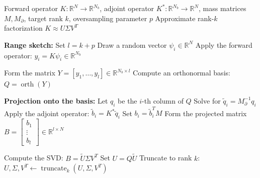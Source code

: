 \begin{algorithm}[!thbp]
\caption{Matrix-free rSVD approximation of $K$}
\label{alg:discrete_rsvd}
\begin{algorithmic}[1]
    \Require Forward operator $K: \mathbb{R}^N \to \mathbb{R}^{N_b}$, adjoint operator $K^*: \mathbb{R}^{N_b} \to \mathbb{R}^N$, mass matrices $M, M_\partial$, target rank $k$, oversampling parameter $p$
    \Ensure Approximate rank-$k$ factorization $K \approx U \Sigma V^T$
    
    \State \textbf{Range sketch:}
    \State Set $l = k + p$
        \State Draw a random vector $\psi_i \in \mathbb{R}^N$
        \State Apply the forward operator: $y_i = K \psi_i \in \mathbb{R}^{N_b}$
    \EndFor

    \State Form the matrix $Y = [y_1, \dots, y_l] \in \mathbb{R}^{N_b \times l}$ 
    \State Compute an orthonormal basis: $Q = \operatorname{orth}(Y)$

    \State \textbf{Projection onto the basis:}
        \State Let $q_i$ be the $i$-th column of $Q$
        \State Solve for $\tilde q_i = M_{\partial}^{-1} q_i$
        \State Apply the adjoint operator: $\tilde b_i = K^* \tilde q_i$
        \State Set $b_i = \tilde b_i^T M$ 
    \EndFor
    \State Form the projected matrix $B = \begin{bmatrix} b_1 \\ \vdots \\ b_l \end{bmatrix} \in \mathbb{R}^{l \times N}$

    \State Compute the SVD: $B = \tilde U \Sigma V^T$
    \State Set $U = Q \tilde U$
    \State Truncate to rank $k$: $U, \Sigma, V^T \leftarrow \operatorname{truncate}_k(U, \Sigma, V^T)$
    
\end{algorithmic}
\end{algorithm}